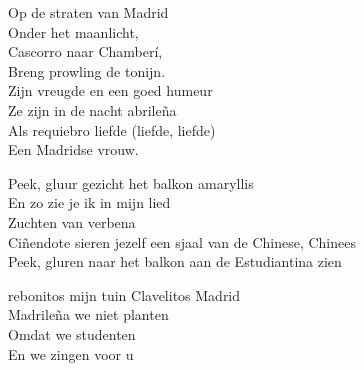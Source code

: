 \clearpage
\begin{translation}
Op de straten van Madrid\\
Onder het maanlicht,\\
Cascorro naar Chamberí,\\
Breng prowling de tonijn.\\
Zijn vreugde en een goed humeur\\
Ze zijn in de nacht abrileña\\
Als requiebro liefde (liefde, liefde)\\
Een Madridse vrouw.\vspace{\wlskip}

Peek, gluur gezicht het balkon amaryllis\\
En zo zie je ik in mijn lied\\
Zuchten van verbena\\
Ciñendote sieren jezelf een sjaal van de Chinese, Chinees\\
Peek, gluren naar het balkon aan de Estudiantina zien\vspace{\wlskip}

rebonitos mijn tuin Clavelitos Madrid\\
Madrileña we niet planten\\
Omdat we studenten\\
En we zingen voor u
\end{translation}
